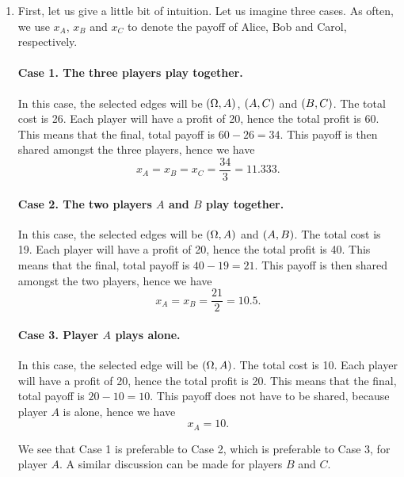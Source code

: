 \begin{enumerate} [label=\alph*.]
	\item First, let us give a little bit of intuition.
	Let us imagine three cases. As often, we use $x_{A}$, $x_{B}$ and $x_{C}$ to denote the payoff of Alice, Bob and Carol, respectively.
	
	\paragraph{Case 1. The three players play together.}
	In this case, the selected edges will be $\left(\Omega, A\right)$, $\left(A, C\right)$ and $\left(B, C\right)$. The total cost is 26. Each player will have a profit of 20, hence the total profit is 60. This means that the final, total payoff is $60 - 26 = 34$. This payoff is then shared amongst the three players, hence we have
	\begin{equation*}
	    x_{A} = x_{B} = x_{C} = \dfrac{34}{3} = 11.333.
	\end{equation*}
	
	\paragraph{Case 2. The two players $A$ and $B$ play together.}
	In this case, the selected edges will be $\left(\Omega, A\right)$ and $\left(A, B\right)$. The total cost is 19. Each player will have a profit of 20, hence the total profit is 40. This means that the final, total payoff is $40 - 19 = 21$. This payoff is then shared amongst the two players, hence we have
	\begin{equation*}
	    x_{A} = x_{B} = \dfrac{21}{2} = 10.5.
	\end{equation*}
	
	
	\paragraph{Case 3. Player $A$ plays alone.}
	In this case, the selected edge will be $\left(\Omega, A\right)$. The total cost is 10. Each player will have a profit of 20, hence the total profit is 20. This means that the final, total payoff is $20 - 10 = 10$. This payoff does not have to be shared, because player $A$ is alone, hence we have
	\begin{equation*}
	    x_{A} = 10.
	\end{equation*}
	
	We see that Case 1 is preferable to Case 2, which is preferable to Case 3, for player $A$. A similar discussion can be made for players $B$ and $C$. 
	

\end{enumerate}
